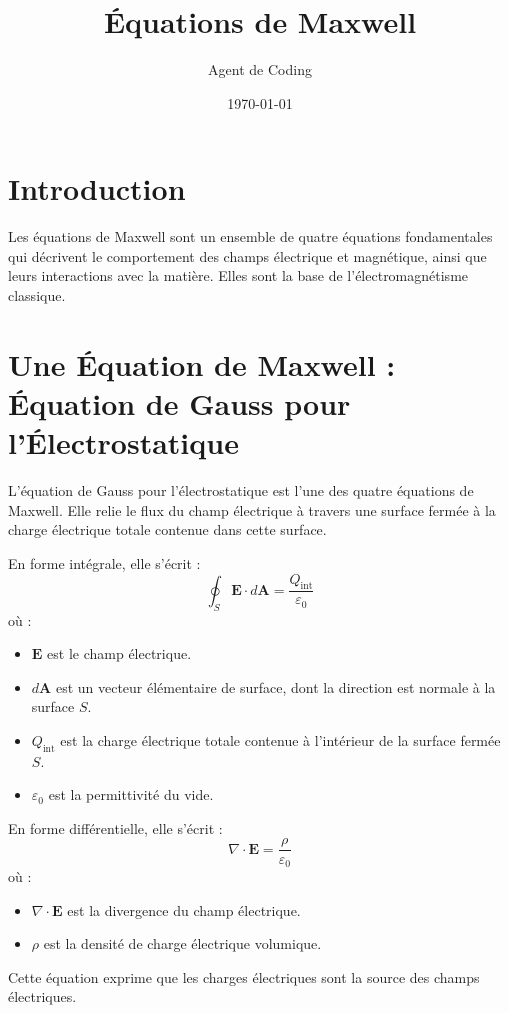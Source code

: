 \documentclass{article}
\title{Équations de Maxwell}
\author{Agent de Coding}
\date{\today}
\begin{document}
\maketitle

\section*{Introduction}
Les équations de Maxwell sont un ensemble de quatre équations fondamentales qui décrivent le comportement des champs électrique et magnétique, ainsi que leurs interactions avec la matière. Elles sont la base de l'électromagnétisme classique.

\section*{Une Équation de Maxwell : Équation de Gauss pour l'Électrostatique}

L'équation de Gauss pour l'électrostatique est l'une des quatre équations de Maxwell. Elle relie le flux du champ électrique à travers une surface fermée à la charge électrique totale contenue dans cette surface.

En forme intégrale, elle s'écrit :
\begin{equation*}
    \oint_S \mathbf{E} \cdot d\mathbf{A} = \frac{Q_{\text{int}}}{\varepsilon_0}
\end{equation*}
où :
\begin{itemize}
    \item $\mathbf{E}$ est le champ électrique.
    \item $d\mathbf{A}$ est un vecteur élémentaire de surface, dont la direction est normale à la surface $S$.
    \item $Q_{\text{int}}$ est la charge électrique totale contenue à l'intérieur de la surface fermée $S$.
    \item $\varepsilon_0$ est la permittivité du vide.
\end{itemize}

En forme différentielle, elle s'écrit :
\begin{equation*}
    \nabla \cdot \mathbf{E} = \frac{\rho}{\varepsilon_0}
\end{equation*}
où :
\begin{itemize}
    \item $\nabla \cdot \mathbf{E}$ est la divergence du champ électrique.
    \item $\rho$ est la densité de charge électrique volumique.
\end{itemize}

Cette équation exprime que les charges électriques sont la source des champs électriques.
\end{document}

